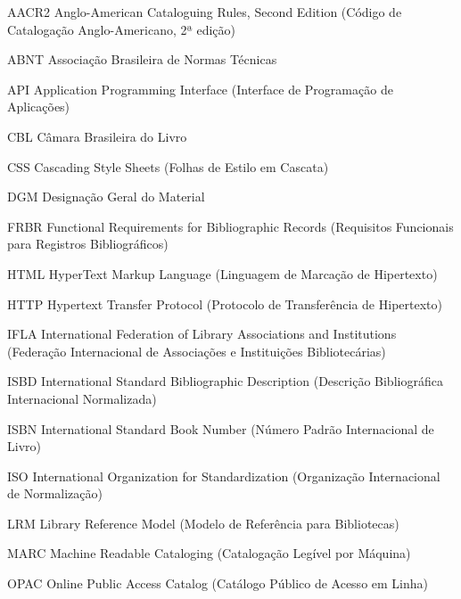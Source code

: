 
\begin{siglas}
    \item [AACR2] Anglo-American Cataloguing Rules, Second Edition (Código de Catalogação Anglo-Americano, 2ª edição)
    \item [ABNT] Associação Brasileira de Normas Técnicas
    \item [API] Application Programming Interface (Interface de Programação de Aplicações)
    \item [CBL] Câmara Brasileira do Livro
    \item [CSS] Cascading Style Sheets (Folhas de Estilo em Cascata)
    \item [DGM] Designação Geral do Material
    \item [FRBR] Functional Requirements for Bibliographic Records (Requisitos Funcionais para Registros Bibliográficos)
    \item [HTML] HyperText Markup Language (Linguagem de Marcação de Hipertexto)
    \item [HTTP] Hypertext Transfer Protocol (Protocolo de Transferência de Hipertexto)
    \item [IFLA] International Federation of Library Associations and Institutions (Federação Internacional de Associações e Instituições Bibliotecárias)
    \item [ISBD] International Standard Bibliographic Description (Descrição Bibliográfica Internacional Normalizada)
    \item [ISBN] International Standard Book Number (Número Padrão Internacional de Livro)
    \item [ISO] International Organization for Standardization (Organização Internacional de Normalização)
    \item [LRM] Library Reference Model (Modelo de Referência para Bibliotecas)
    \item [MARC] Machine Readable Cataloging (Catalogação Legível por Máquina)
    \item [OPAC] Online Public Access Catalog (Catálogo Público de Acesso em Linha)

\end{siglas}
